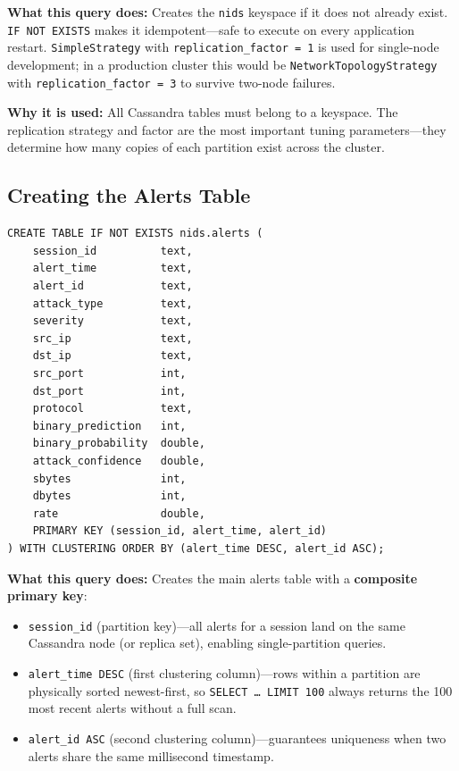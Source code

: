 \documentclass[12pt,a4paper]{report}
\begin{document}
\textbf{What this query does:}  Creates the \texttt{nids} keyspace if it does
not already exist.  \texttt{IF NOT EXISTS} makes it idempotent---safe to
execute on every application restart.  \texttt{SimpleStrategy} with
\texttt{replication\_factor~=~1} is used for single-node development; in a
production cluster this would be \texttt{NetworkTopologyStrategy} with
\texttt{replication\_factor~=~3} to survive two-node failures.

\textbf{Why it is used:}  All Cassandra tables must belong to a keyspace.  The
replication strategy and factor are the most important tuning parameters---they
determine how many copies of each partition exist across the cluster.

\subsection{Creating the Alerts Table}
\begin{lstlisting}[style=cqlstyle,
  caption={CQL: Create the nids.alerts table},
  label={lst:alerts-ddl}]
CREATE TABLE IF NOT EXISTS nids.alerts (
    session_id          text,
    alert_time          text,
    alert_id            text,
    attack_type         text,
    severity            text,
    src_ip              text,
    dst_ip              text,
    src_port            int,
    dst_port            int,
    protocol            text,
    binary_prediction   int,
    binary_probability  double,
    attack_confidence   double,
    sbytes              int,
    dbytes              int,
    rate                double,
    PRIMARY KEY (session_id, alert_time, alert_id)
) WITH CLUSTERING ORDER BY (alert_time DESC, alert_id ASC);
\end{lstlisting}

\textbf{What this query does:}  Creates the main alerts table with a
\textbf{composite primary key}:
\begin{itemize}
  \item \texttt{session\_id} (partition key)---all alerts for a session land
        on the same Cassandra node (or replica set), enabling single-partition
        queries.
  \item \texttt{alert\_time DESC} (first clustering column)---rows within a
        partition are physically sorted newest-first, so
        \texttt{SELECT~\ldots~LIMIT~100} always returns the 100 most recent
        alerts without a full scan.
  \item \texttt{alert\_id ASC} (second clustering column)---guarantees
        uniqueness when two alerts share the same millisecond timestamp.
\end{itemize}
\end{document}
